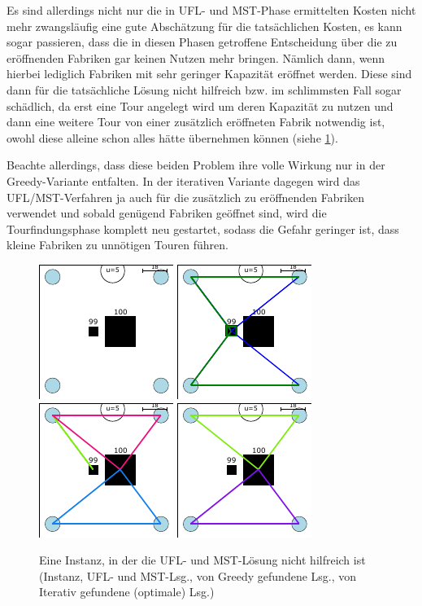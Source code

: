 \documentclass[a4paper,ngerman,11pt,bibtotoc]{scrartcl}
\theoremstyle{definition}
\theoremstyle{plain}
\theoremstyle{remark}
\newcommand{\MST}{MST}
\newcommand{\UFL}{UFL}
\begin{document}
	Es sind allerdings nicht nur die in \UFL- und \MST-Phase ermittelten Kosten nicht mehr zwangsläufig eine gute Abschätzung für die tatsächlichen Kosten, es kann sogar passieren, dass die in diesen Phasen getroffene Entscheidung über die zu eröffnenden Fabriken gar keinen Nutzen mehr bringen. Nämlich dann, wenn hierbei lediglich Fabriken mit sehr geringer Kapazität eröffnet werden. Diese sind dann für die tatsächliche Lösung nicht hilfreich bzw. im schlimmsten Fall sogar schädlich, da erst eine Tour angelegt wird um deren Kapazität zu nutzen und dann eine weitere Tour von einer zusätzlich eröffneten Fabrik notwendig ist, owohl diese alleine schon alles hätte übernehmen können (siehe \cref{fig:bsp:UFLMSTnutzlos}).
	
	Beachte allerdings, dass diese beiden Problem ihre volle Wirkung nur in der Greedy-Variante entfalten. In der iterativen Variante dagegen wird das \UFL/\MST-Verfahren ja auch für die zusätzlich zu eröffnenden Fabriken verwendet und sobald genügend Fabriken geöffnet sind, wird die Tourfindungsphase komplett neu gestartet, sodass die Gefahr geringer ist, dass kleine Fabriken zu unnötigen Touren führen.
		
	\begin{figure}[h]\centering
		\includegraphics[width=.24\textwidth]{bilder/beispiele/bsp2-instance.pdf}
		\includegraphics[width=.24\textwidth]{bilder/beispiele/bsp2-UFLMST.pdf}
		\includegraphics[width=.24\textwidth]{bilder/beispiele/bsp2-Greedy.pdf}
		\includegraphics[width=.24\textwidth]{bilder/beispiele/bsp2-It.pdf}
		\caption{Eine Instanz, in der die \UFL- und \MST-Lösung nicht hilfreich ist (Instanz, \UFL- und \MST-Lsg., von Greedy gefundene Lsg., von Iterativ gefundene (optimale) Lsg.)}\label{fig:bsp:UFLMSTnutzlos}
	\end{figure}
\end{document}
